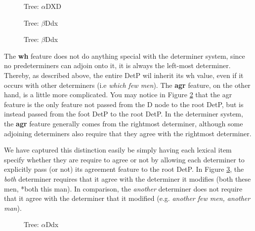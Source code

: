 \begin{figure}[ht]
\centering
{}
\caption{ \label{DXD} Tree:  $\alpha$DXD}
\end{figure}


\begin{figure}[ht]
\centering
{}
\caption{\label{Ddx-features} Tree:  $\beta$Ddx}
\end{figure}



\begin{figure}[ht]
\centering
{}
\caption{ \label{Ddx_both} Tree:  $\beta$Ddx}
\end{figure}


The {\bf wh} feature does not do anything special with the determiner system, since
no predeterminers can adjoin onto it, it is always the left-most determiner.
Thereby, as described above, the entire DetP wil inherit its wh value, even if
it occurs with other determiners (i.e {\it which few men}).  The {\bf agr} feature, on
the other hand, is a little more complicated.  You may notice in Figure \ref{Ddx-features} that the agr feature is the only feature not passed from
the D node to the root DetP, but is instead passed from the foot DetP to the
root DetP.  In the determiner system, the {\bf agr} feature generally comes from the
rightmost determiner, although some adjoining determiners also require that
they agree with the rightmost determiner.  


We have captured this distinction easily be simply having each
lexical item specify whether they are require to agree or not by allowing each
determiner to explicitly pass (or not) its agreement feature to the root DetP.
In Figure \ref{Ddx_both}, the {\it both} determiner requires that it
agree with the determiner it modifies (both these men, *both this man).  In
comparison, the {\it another} determiner does not require that it agree with the
determiner that it modified (e.g. {\it another few men, another man}).  


\begin{figure}[ht]
\centering
{}
\caption{ Tree:  $\alpha$Ddx}
\label{Ddx}
\end{figure}

